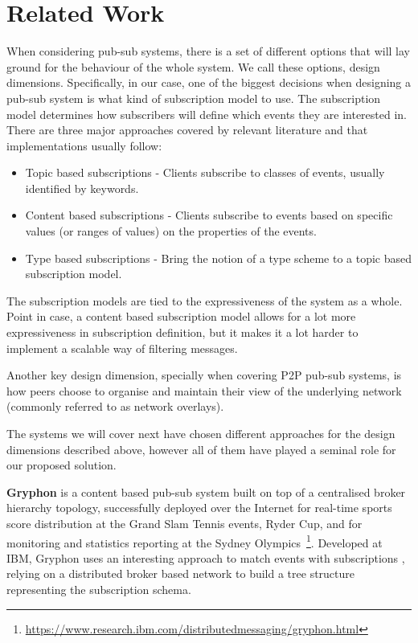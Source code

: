 
\section{Related Work}
\label{section:related-work}

When considering pub-sub systems, there is a set of different options that will
lay ground for the behaviour of the whole system. We call these options, design
dimensions. Specifically, in our case, one of the biggest decisions when
designing a pub-sub system is what kind of subscription model to use. The
subscription model determines how subscribers will define which events they are
interested in. There are three major approaches covered by relevant literature
\cite{Kermarrec2013} \cite{Eugster2003} and that implementations usually
follow:

\begin{itemize}
  \item
    Topic based subscriptions - Clients subscribe to classes of events, usually identified by keywords.\cite{Castro2002}\cite{Zhuang2001}\cite{Baldoni2007}\cite{Apolonia2018}\cite{Setty2012}
  \item
    Content based subscriptions - Clients subscribe to events based on specific values (or ranges of values) on the properties of the events.\cite{Strom1998}\cite{Cugola2001}\cite{Carzaniga2003}\cite{Gupta2004}\cite{Bharambe2002}\cite{Voulgaris2005}
  \item
    Type based subscriptions\cite{Eugster2000} - Bring the notion of a type scheme to a topic based subscription model.\cite{Pietzuch2002}
\end{itemize}

The subscription models are tied to the expressiveness of the system as a
whole. Point in case, a content based subscription model allows for a lot more
expressiveness in subscription definition, but it makes it a lot harder to
implement a scalable way of filtering messages.

Another key design dimension, specially when covering P2P pub-sub systems, is
how peers choose to organise and maintain their view of the underlying network
(commonly referred to as network overlays). 

The systems we will cover next have chosen different approaches for the design
dimensions described above, however all of them have played a seminal role for
our proposed solution.

\textbf{Gryphon} \cite{Strom1998} is a content based pub-sub system built on
top of a centralised broker hierarchy topology, successfully deployed over the
Internet for real-time sports score distribution at the Grand Slam Tennis
events, Ryder Cup, and for monitoring and statistics reporting at the Sydney
Olympics~\footnote{\url{https://www.research.ibm.com/distributedmessaging/gryphon.html}}.
Developed at IBM, Gryphon uses an interesting approach to match events with
subscriptions \cite{Aguilera1999}, relying on a distributed broker based
network to build a tree structure representing the subscription schema. 


